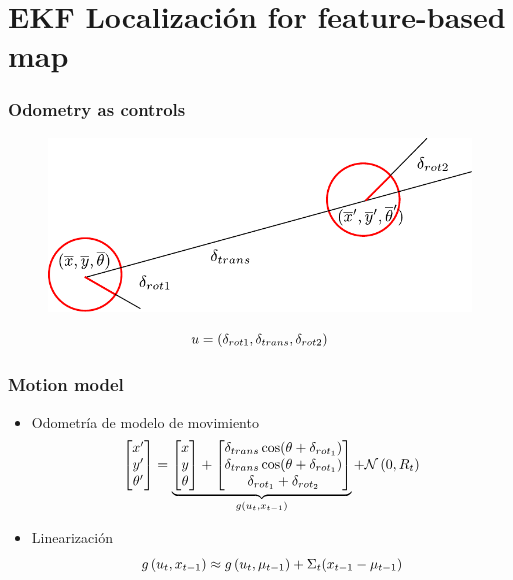 \section{EKF Localización for feature-based map}

\begin{frame}
	\frametitle{Odometry as controls}
	
   	\begin{figure}[!h]
        \includegraphics[width=0.6\columnwidth]{./images/odometry_as_controls.pdf}
    \end{figure}

    \begin{equation*}
        u = (\delta_{rot1}, \delta_{trans}, \delta_{rot2})
    \end{equation*}
	
\end{frame}

\begin{frame}
	\frametitle{Motion model}
	
	\begin{itemize}
		\item Odometría de modelo de movimiento
		\begin{equation*}
			\begin{bmatrix}
				x^{\prime} \\
				y^{\prime} \\
				\theta^{\prime}
			\end{bmatrix} =
			\underbrace{
				\begin{bmatrix}
				x \\
				y \\
				\theta
			\end{bmatrix} +
			\begin{bmatrix}
				\delta_{trans}\cos(\theta+\delta_{rot_{1}}) \\
				\delta_{trans}\cos(\theta+\delta_{rot_{1}}) \\
				\delta_{rot_{1}} + \delta_{rot_{2}}
			\end{bmatrix}
			}_{g\left( u_{t}, x_{t-1} \right)} + \mathcal{N}\left( {0}, {R_{t}} \right)
		\end{equation*}
		\item Linearización
		\begin{equation*}
			g\left( u_{t}, x_{t-1} \right) \approx 			g\left( u_{t}, \mu_{t-1} \right) + \Sigma_{t}(x_{t-1}-\mu_{t-1})
		\end{equation*}
	\end{itemize}
	
\end{frame}

